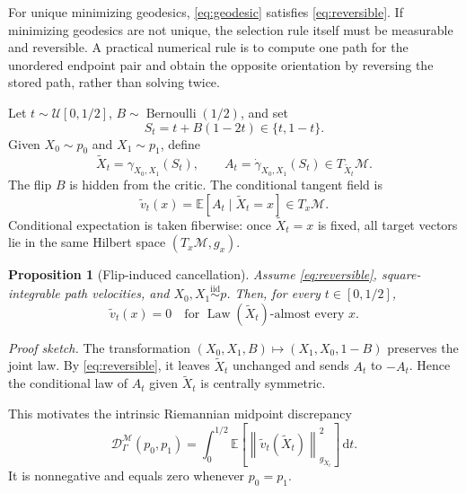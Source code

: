 \documentclass[10pt,twocolumn]{article}
\newtheorem{proposition}{Proposition}
\newcommand{\M}{\mathcal{M}}
\newcommand{\E}{\mathbb{E}}
\newcommand{\Law}{\operatorname{Law}}
\newcommand{\Ber}{\operatorname{Bernoulli}}
\newcommand{\norm}[2][]{\left\lVert #2\right\rVert_{#1}}
\newcommand{\dd}{\,\mathrm{d}}
\begin{document}
For unique minimizing geodesics, \cref{eq:geodesic} satisfies \cref{eq:reversible}. If minimizing geodesics are not unique, the selection rule itself must be measurable and reversible. A practical numerical rule is to compute one path for the unordered endpoint pair and obtain the opposite orientation by reversing the stored path, rather than solving twice.

Let $t\sim\mathcal U[0,1/2]$, $B\sim\Ber(1/2)$, and set
\begin{equation}
 S_t=t+B(1-2t)\in\{t,1-t\}.
\end{equation}
Given $X_0\sim p_0$ and $X_1\sim p_1$, define
\begin{equation}
 \widetilde X_t=\gamma_{X_0,X_1}(S_t),\qquad
 A_t=\dot\gamma_{X_0,X_1}(S_t)\in T_{\widetilde X_t}\M.
 \label{eq:flipped-rm}
\end{equation}
The flip $B$ is hidden from the critic. The conditional tangent field is
\begin{equation}
 \widetilde v_t(x)=\E[A_t\mid \widetilde X_t=x]\in T_x\M.
 \label{eq:conditional-tangent}
\end{equation}
Conditional expectation is taken fiberwise: once $\widetilde X_t=x$ is fixed, all target vectors lie in the same Hilbert space $(T_x\M,g_x)$.

\begin{proposition}[Flip-induced cancellation]
Assume \cref{eq:reversible}, square-integrable path velocities, and $X_0,X_1\stackrel{\mathrm{iid}}{\sim}p$. Then, for every $t\in[0,1/2]$,
\begin{equation}
 \widetilde v_t(x)=0
 \quad\text{for }\Law(\widetilde X_t)\text{-almost every }x.
 \label{eq:cancellation}
\end{equation}
\end{proposition}

\noindent\textit{Proof sketch.}
The transformation $(X_0,X_1,B)\mapsto(X_1,X_0,1-B)$ preserves the joint law. By \cref{eq:reversible}, it leaves $\widetilde X_t$ unchanged and sends $A_t$ to $-A_t$. Hence the conditional law of $A_t$ given $\widetilde X_t$ is centrally symmetric.

This motivates the intrinsic Riemannian midpoint discrepancy
\begin{equation}
 \mathcal D_{\Gamma}^{\M}(p_0,p_1)
 =\int_0^{1/2}\E\!\left[
   \norm[g_{\widetilde X_t}]{\widetilde v_t(\widetilde X_t)}^2
 \right]\dd t.
 \label{eq:rm-discrepancy}
\end{equation}
It is nonnegative and equals zero whenever $p_0=p_1$.
\end{document}
